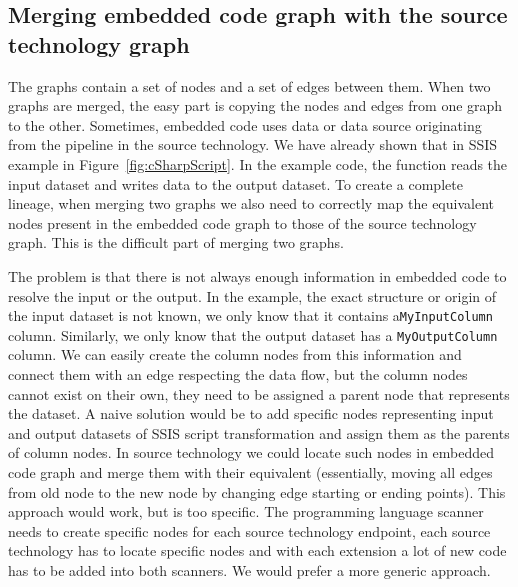 \subsection{Merging embedded code graph with the source technology graph}
The graphs contain a set of nodes and a set of edges between them. When two graphs are merged, the easy part is copying the nodes and edges from one graph to the other. Sometimes, embedded code uses data or data source originating from the pipeline in the source technology. We have already shown that in SSIS example in Figure~\ref{fig:cSharpScript}. In the example code, the function reads the input dataset and writes data to the output dataset. To create a complete lineage, when merging two graphs we also need to correctly map the equivalent nodes present in the embedded code graph to those of the source technology graph. This is the difficult part of merging two graphs.
\par
The problem is that there is not always enough information in embedded code to resolve the input or the output. In the example, the exact structure or origin of the input dataset is not known, we only know that it contains a\texttt{MyInputColumn} column. Similarly, we only know that the output dataset has a \texttt{MyOutputColumn} column. We can easily create the column nodes from this information and connect them with an edge respecting the data flow, but the column nodes cannot exist on their own, they need to be assigned a parent node that represents the dataset. A naive solution would be to add specific nodes representing input and output datasets of SSIS script transformation and assign them as the parents of column nodes. In source technology we could locate such nodes in embedded code graph and merge them with their equivalent (essentially, moving all edges from old node to the new node by changing edge starting or ending points). This approach would work, but is too specific. The programming language scanner needs to create specific nodes for each source technology endpoint, each source technology has to locate specific nodes and with each extension a lot of new code has to be added into both scanners. We would prefer a more generic approach.
\par
